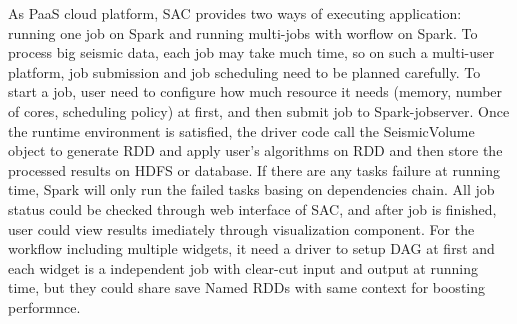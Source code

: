 
As PaaS cloud platform, SAC provides two ways of executing application: running one job on Spark and running multi-jobs with worflow on Spark. To process big seismic data, each job may take much time, so on such a multi-user platform, job submission and job scheduling need to be planned carefully. To start a job, user need to configure how much resource it needs (memory, number of cores, scheduling policy) at first, and then submit job to Spark-jobserver. Once the runtime environment is satisfied, the driver code call the SeismicVolume object to generate RDD and apply user's algorithms on RDD and then store the processed results on HDFS or database. If there are any tasks failure at running time, Spark will only run the failed tasks basing on dependencies chain. All job status could be checked through web interface of SAC, and after job is finished, user could view results imediately through visualization component. For the workflow including multiple widgets, it need a driver to setup DAG at first and each widget is a independent job with clear-cut input and output at running time, but they could share save Named RDDs with same context for boosting performnce.


